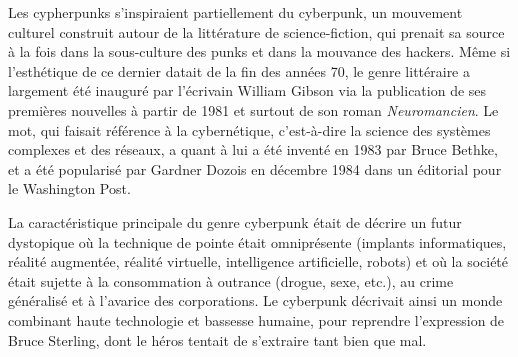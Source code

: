 Les cypherpunks s'inspiraient partiellement du cyberpunk, un mouvement culturel construit autour de la littérature de science-fiction, qui prenait sa source à la fois dans la sous-culture des punks et dans la mouvance des hackers. Même si l'esthétique de ce dernier datait de la fin des années 70, le genre littéraire a largement été inauguré par l'écrivain William Gibson via la publication de ses premières nouvelles à partir de 1981 et surtout de son roman \emph{Neuromancien}. Le mot, qui faisait référence à la cybernétique, c'est-à-dire la science des systèmes complexes et des réseaux, a quant à lui a été inventé en 1983 par Bruce Bethke, et a été popularisé par Gardner Dozois en décembre 1984 dans un éditorial pour le Washington Post. %

La caractéristique principale du genre cyberpunk était de décrire un futur dystopique où la technique de pointe était omniprésente (implants informatiques, réalité augmentée, réalité virtuelle, intelligence artificielle, robots) et où la société était sujette à la consommation à outrance (drogue, sexe, etc.), au crime généralisé et à l'avarice des corporations. Le cyberpunk décrivait ainsi un monde combinant haute technologie et bassesse humaine, pour reprendre l'expression de Bruce Sterling, dont le héros tentait de s'extraire tant bien que mal. %

